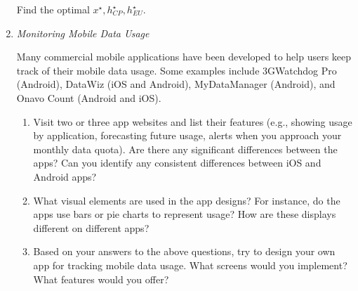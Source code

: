 \begin{enumerate}
Find the optimal $x^\star, h_{CP}^\star, h_{EU}^\star$.\\

\item \emph{Monitoring Mobile Data Usage}

Many commercial mobile applications have been developed to help users keep track of their mobile data usage. Some examples include 3GWatchdog Pro (Android), DataWiz (iOS and Android), MyDataManager (Android), and Onavo Count (Android and iOS).
\begin{enumerate}
\item
Visit two or three app websites and list their features (e.g., showing usage by application, forecasting future usage, alerts when you approach your monthly data quota). Are there any significant differences between the apps? Can you identify any consistent differences between iOS and Android apps?
\item
What visual elements are used in the app designs? For instance, do the apps use bars or pie charts to represent usage? How are these displays different on different apps?
\item
Based on your answers to the above questions, try to design your own app for tracking mobile data usage. What screens would you implement? What features would you offer?
\end{enumerate}
\end{enumerate}